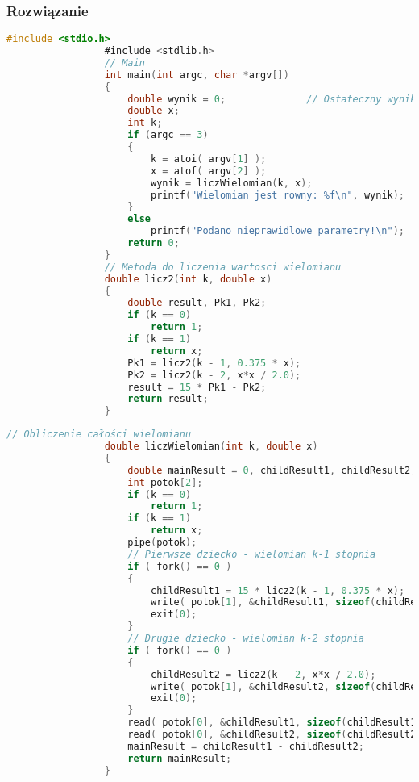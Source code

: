 		\subsubsection{Rozwiązanie}
			\begin{lstlisting}[language=C]
				 #include <stdio.h>
				 #include <stdlib.h>
				 // Main
				 int main(int argc, char *argv[])
				 {	
					 double wynik = 0;				// Ostateczny wynik programu
					 double x;
					 int k;
					 if (argc == 3)
					 {		
						 k = atoi( argv[1] );
						 x = atof( argv[2] );
						 wynik = liczWielomian(k, x);
						 printf("Wielomian jest rowny: %f\n", wynik);
					 }
					 else
						 printf("Podano nieprawidlowe parametry!\n");
					 return 0;
				 }
				 // Metoda do liczenia wartosci wielomianu
				 double licz2(int k, double x)
				 {
					 double result, Pk1, Pk2;
					 if (k == 0)
						 return 1;
					 if (k == 1)
						 return x;
					 Pk1 = licz2(k - 1, 0.375 * x);
					 Pk2 = licz2(k - 2, x*x / 2.0);
					 result = 15 * Pk1 - Pk2;
					 return result;
				 }
			\end{lstlisting}
			\newpage
			\begin{lstlisting}[language=C]
				 // Obliczenie całości wielomianu
				 double liczWielomian(int k, double x)
				 {
					 double mainResult = 0, childResult1, childResult2;
					 int potok[2];
					 if (k == 0)
						 return 1;
					 if (k == 1)
						 return x;
					 pipe(potok);
					 // Pierwsze dziecko - wielomian k-1 stopnia
					 if ( fork() == 0 )
					 {
						 childResult1 = 15 * licz2(k - 1, 0.375 * x);
						 write( potok[1], &childResult1, sizeof(childResult1) );
						 exit(0);
					 }
					 // Drugie dziecko - wielomian k-2 stopnia
					 if ( fork() == 0 )
					 {
						 childResult2 = licz2(k - 2, x*x / 2.0);
						 write( potok[1], &childResult2, sizeof(childResult2) );
						 exit(0);
					 }
					 read( potok[0], &childResult1, sizeof(childResult1) );
					 read( potok[0], &childResult2, sizeof(childResult2) );
					 mainResult = childResult1 - childResult2;
					 return mainResult;
				 }
			\end{lstlisting}